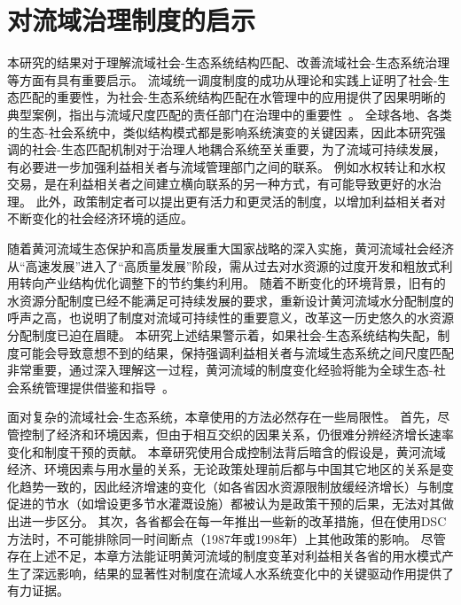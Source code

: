 \section{对流域治理制度的启示}

本研究的结果对于理解流域社会-生态系统结构匹配、改善流域社会-生态系统治理等方面有具有重要启示。
流域统一调度制度的成功从理论和实践上证明了社会-生态匹配的重要性，为社会-生态系统结构匹配在水管理中的应用提供了因果明晰的典型案例，指出与流域尺度匹配的责任部门在治理中的重要性~\cite{bodin2017b, ostrom2009, reyers2018}。
全球各地、各类的生态-社会系统中，类似结构模式都是影响系统演变的关键因素，因此本研究强调的社会-生态匹配机制对于治理人地耦合系统至关重要，为了流域可持续发展，有必要进一步加强利益相关者与流域管理部门之间的联系。
例如水权转让和水权交易，是在利益相关者之间建立横向联系的另一种方式，有可能导致更好的水治理\cite{zhenghang2019}。
此外，政策制定者可以提出更有活力和更灵活的制度，以增加利益相关者对不断变化的社会经济环境的适应\cite{reyers2018}。

随着黄河流域生态保护和高质量发展重大国家战略的深入实施，黄河流域社会经济从“高速发展”进入了“高质量发展”阶段，需从过去对水资源的过度开发和粗放式利用转向产业结构优化调整下的节约集约利用。
随着不断变化的环境背景，旧有的水资源分配制度已经不能满足可持续发展的要求，重新设计黄河流域水分配制度的呼声之高，也说明了制度对流域可持续性的重要意义，改革这一历史悠久的水资源分配制度已迫在眉睫\cite{wang2019a}。
本研究上述结果警示着，如果社会-生态系统结构失配，制度可能会导致意想不到的结果，保持强调利益相关者与流域生态系统之间尺度匹配非常重要，通过深入理解这一过程，黄河流域的制度变化经验将能为全球生态-社会系统管理提供借鉴和指导~\cite{hegwood2022, muneepeerakul2017, leslie2015}。

面对复杂的流域社会-生态系统，本章使用的方法必然存在一些局限性。
首先，尽管控制了经济和环境因素，但由于相互交织的因果关系，仍很难分辨经济增长速率变化和制度干预的贡献。
本章研究使用合成控制法背后暗含的假设是，黄河流域经济、环境因素与用水量的关系，无论政策处理前后都与中国其它地区的关系是变化趋势一致的，因此经济增速的变化（如各省因水资源限制放缓经济增长）与制度促进的节水（如增设更多节水灌溉设施）都被认为是政策干预的后果，无法对其做出进一步区分。
其次，各省都会在每一年推出一些新的改革措施，但在使用DSC方法时，不可能排除同一时间断点（1987年或1998年）上其他政策的影响。
尽管存在上述不足，本章方法能证明黄河流域的制度变革对利益相关各省的用水模式产生了深远影响，结果的显著性对制度在流域人水系统变化中的关键驱动作用提供了有力证据。
